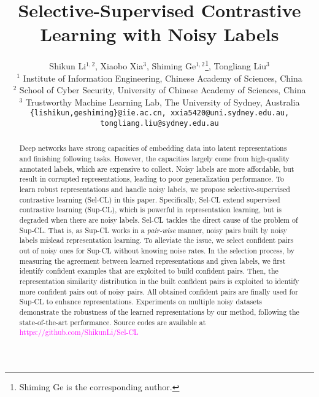 \documentclass[10pt,twocolumn,letterpaper]{article}
\begin{document}
\title{Selective-Supervised Contrastive Learning with Noisy Labels}



\author{
Shikun Li$^{1,2}$, Xiaobo Xia$^{3}$, Shiming Ge$^{1,2}$\thanks{Shiming Ge is the corresponding author.}, Tongliang Liu$^{3}$ \\ 
$^{1}$ Institute of Information Engineering, Chinese Academy of Sciences, China \\
$^{2}$ School of Cyber Security, University of Chinese Academy of Sciences, China \\ 
$^{3}$ Trustworthy Machine Learning Lab, The University of Sydney, Australia \\
{\tt\small \{lishikun,geshiming\}@iie.ac.cn, xxia5420@uni.sydney.edu.au, tongliang.liu@sydney.edu.au}
}
\maketitle

\begin{abstract}
Deep networks have strong capacities of embedding data into latent representations and finishing following tasks. However, the capacities largely come from high-quality annotated labels, which are expensive to collect. Noisy labels are more affordable, but result in corrupted representations, leading to poor generalization performance. To learn robust representations and handle noisy labels, we propose selective-supervised  contrastive learning (Sel-CL) in this paper. Specifically, Sel-CL extend supervised contrastive learning (Sup-CL), which is powerful in representation learning, but is degraded when there are noisy labels. Sel-CL tackles the direct cause of the problem of Sup-CL. That is, as Sup-CL works in a \textit{pair-wise} manner, noisy pairs built by noisy labels mislead representation learning. To alleviate the issue, we select confident pairs out of noisy ones for Sup-CL without knowing noise rates. In the selection process, by measuring the agreement between learned representations and given labels, we first identify confident examples that are exploited to build confident pairs. Then, the representation similarity distribution in the built confident pairs is exploited to identify more confident pairs out of noisy pairs. All obtained confident pairs are finally used for Sup-CL to enhance representations. Experiments on multiple noisy datasets demonstrate the robustness of the learned representations by our method, following the state-of-the-art performance. Source codes are available at \textcolor{magenta}{https://github.com/ShikunLi/Sel-CL}
\end{abstract}
\end{document}

